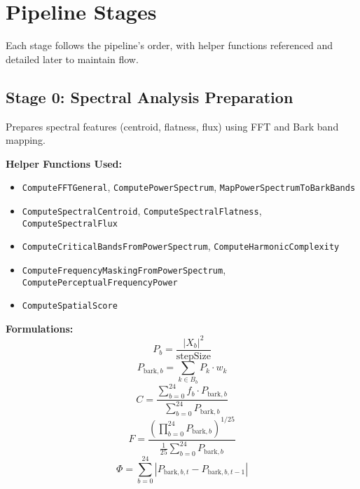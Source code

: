 \documentclass[11pt]{article}
\begin{document}
\section{Pipeline Stages}
Each stage follows the pipeline’s order, with helper functions referenced and detailed later to maintain flow.

\subsection{Stage 0: Spectral Analysis Preparation}
Prepares spectral features (centroid, flatness, flux) using FFT and Bark band mapping.

\textbf{Helper Functions Used:}
\begin{itemize}
  \item \texttt{ComputeFFTGeneral}, \texttt{ComputePowerSpectrum}, \texttt{MapPowerSpectrumToBarkBands}
  \item \texttt{ComputeSpectralCentroid}, \texttt{ComputeSpectralFlatness}, \texttt{ComputeSpectralFlux}
  \item \texttt{ComputeCriticalBandsFromPowerSpectrum}, \texttt{ComputeHarmonicComplexity}
  \item \texttt{ComputeFrequencyMaskingFromPowerSpectrum}, \texttt{ComputePerceptualFrequencyPower}
  \item \texttt{ComputeSpatialScore}
\end{itemize}

\textbf{Formulations:}
\begin{equation}
P_b = \frac{|X_b|^2}{\text{stepSize}}
\end{equation}
\begin{equation}
P_{\text{bark},b} = \sum_{k \in B_b} P_k \cdot w_k
\end{equation}
\begin{equation}
C = \frac{\sum_{b=0}^{24} f_b \cdot P_{\text{bark},b}}{\sum_{b=0}^{24} P_{\text{bark},b}}
\end{equation}
\begin{equation}
F = \frac{\left(\prod_{b=0}^{24} P_{\text{bark},b}\right)^{1/25}}{\frac{1}{25} \sum_{b=0}^{24} P_{\text{bark},b}}
\end{equation}
\begin{equation}
\Phi = \sum_{b=0}^{24} |P_{\text{bark},b,t} - P_{\text{bark},b,t-1}|
\end{equation}
\end{document}
